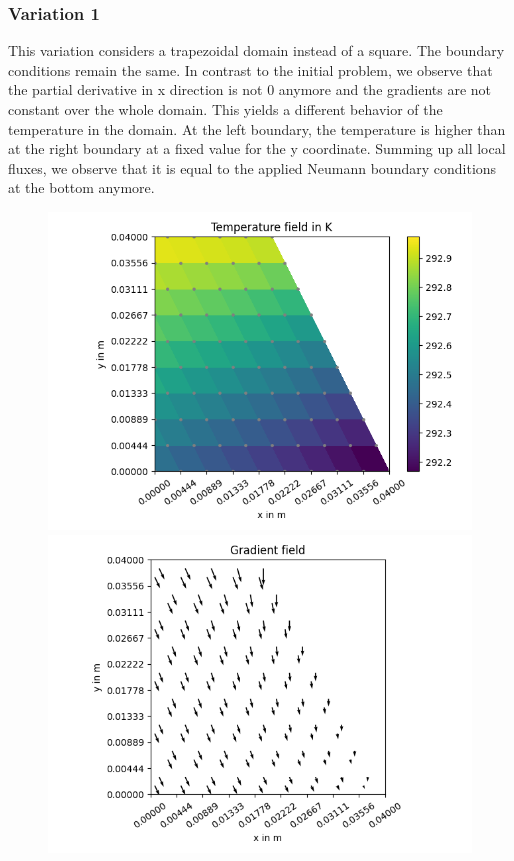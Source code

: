 \documentclass[a4paper,pt]{report}
\begin{document}
\subsubsection*{Variation 1}
This variation considers a trapezoidal domain instead of a square. The boundary conditions remain the same. In contrast to the initial problem, we observe that the partial derivative in x direction is not 0 anymore and the gradients are not constant over the whole domain. This yields a different behavior of the temperature in the domain. At the left boundary, the temperature is higher than at the right boundary at a fixed value for the y coordinate. Summing up all local fluxes, we observe that it is equal to the applied Neumann boundary conditions at the bottom anymore.
\begin{figure}
	\centering
	\includegraphics[scale=0.3]{temperaturefieldV1.png}
	\includegraphics[scale=0.3]{gradientfieldV1.png}

\end{figure}
\end{document}
